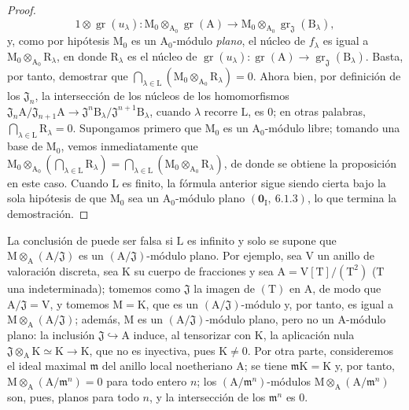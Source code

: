 \begin{proof}
\[
1\otimes\operatorname{gr}(u_\lambda) : \mathrm{M}_0\otimes_{\mathrm{A}_0}\operatorname{gr}(\mathrm{A}) \to \mathrm{M}_0\otimes_{\mathrm{A}_0}\operatorname{gr}_\mathfrak{J}(\mathrm{B}_\lambda),
\]
y, como por hipótesis $\mathrm{M}_0$ es un $\mathrm{A}_0$-módulo \emph{plano}, el núcleo de $f_\lambda$ es igual a $\mathrm{M}_0\otimes_{\mathrm{A}_0}\mathrm{R}_\lambda$,
en donde $\mathrm{R}_\lambda$ es el núcleo de $\operatorname{gr}(u_\lambda):\operatorname{gr}(\mathrm{A})\to\operatorname{gr}_\mathfrak{J}(\mathrm{B}_\lambda)$. Basta, por tanto, demostrar que
$\bigcap_{\lambda\in\mathrm{L}}(\mathrm{M}_0\otimes_{\mathrm{A}_0}\mathrm{R}_\lambda)=0$. Ahora bien, por definición de los $\mathfrak{J}_n$, la intersección de los núcleos de los homomorfismos
$\mathfrak{J}_n\mathrm{A}/\mathfrak{J}_{n+1}\mathrm{A}\to\mathfrak{J}^n\mathrm{B}_\lambda/\mathfrak{J}^{n+1}\mathrm{B}_\lambda$, cuando $\lambda$ recorre $\mathrm{L}$, es $0$; en otras
palabras, $\bigcap_{\lambda\in\mathrm{L}}\mathrm{R}_\lambda=0$. Supongamos primero que $\mathrm{M}_0$ es un $\mathrm{A}_0$-módulo libre; tomando
una base de $\mathrm{M}_0$, vemos inmediatamente que $\mathrm{M}_0\otimes_{\mathrm{A}_0}(\bigcap_{\lambda\in\mathrm{L}}\mathrm{R}_\lambda)=\bigcap_{\lambda\in\mathrm{L}}(\mathrm{M}_0\otimes_{\mathrm{A}_0}\mathrm{R}_\lambda)$, de donde se obtiene la
proposición en este caso. Cuando $\mathrm{L}$ es finito, la fórmula anterior sigue siendo cierta bajo
la sola hipótesis de que $\mathrm{M}_0$ sea un $\mathrm{A}_0$-módulo plano $(\mathbf{0}_\mathrm{I},~6.1.3)$, lo que termina la
demostración.
\end{proof}

\begin{remark}[11.4.2]
\label{IV.11.4.2}
La conclusión de  puede ser falsa si $\mathrm{L}$ es infinito
y solo se supone que $\mathrm{M}\otimes_\mathrm{A}(\mathrm{A}/\mathfrak{J})$ es un $(\mathrm{A}/\mathfrak{J})$-módulo plano. Por ejemplo,
sea $\mathrm{V}$ un anillo de valoración discreta, sea $\mathrm{K}$ su cuerpo de fracciones y sea $\mathrm{A}=\mathrm{V}[\mathrm{T}]/(\mathrm{T}^2)$
($\mathrm{T}$ una indeterminada); tomemos como $\mathfrak{J}$ la imagen de $(\mathrm{T})$ en $\mathrm{A}$, de modo que $\mathrm{A}/\mathfrak{J}=\mathrm{V}$, y
tomemos $\mathrm{M}=\mathrm{K}$, que es un $(\mathrm{A}/\mathfrak{J})$-módulo y, por tanto, es igual a $\mathrm{M}\otimes_\mathrm{A}(\mathrm{A}/\mathfrak{J})$; además, $\mathrm{M}$ es
un $(\mathrm{A}/\mathfrak{J})$-módulo plano, pero no un $\mathrm{A}$-módulo plano: la inclusión $\mathfrak{J}\hookrightarrow\mathrm{A}$ induce, al tensorizar con $\mathrm{K}$,
la aplicación nula $\mathfrak{J}\otimes_{\mathrm{A}}\mathrm{K}\simeq\mathrm{K}\longrightarrow\mathrm{K}$,
que no es inyectiva, pues $\mathrm{K}\neq0$. Por otra parte, consideremos el ideal maximal $\mathfrak{m}$ del anillo local noetheriano
$\mathrm{A}$; se tiene $\mathfrak{m}\mathrm{K}=\mathrm{K}$ y, por tanto, $\mathrm{M}\otimes_\mathrm{A}(\mathrm{A}/\mathfrak{m}^n)=0$ para todo entero $n$; los $(\mathrm{A}/\mathfrak{m}^n)$-módulos
$\mathrm{M}\otimes_\mathrm{A}(\mathrm{A}/\mathfrak{m}^n)$ son, pues, planos para todo $n$, y la intersección de los $\mathfrak{m}^n$ es $0$.
\end{remark}

